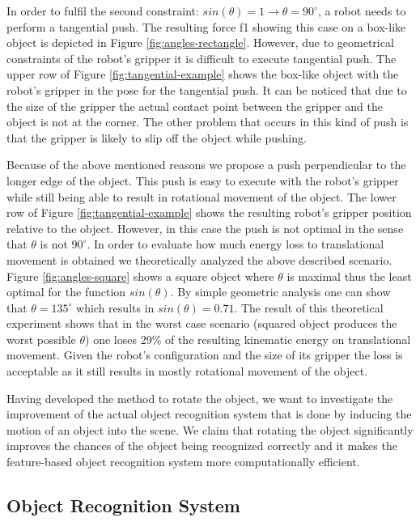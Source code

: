 In order to fulfil the second constraint: $sin(\theta) = 1 \to \theta = 90 ^\circ$, a robot needs to perform a tangential push. The resulting force f1 showing this case on a box-like object is depicted in Figure \ref{fig:angles-rectangle}. However, due to geometrical constraints of the robot's gripper it is difficult to execute tangential push. The upper row of Figure \ref{fig:tangential-example} shows the box-like object with the robot's gripper in the pose for the tangential push. It can be noticed that due to the size of the gripper the actual contact point between the gripper and the object is not at the corner. The other problem that occurs in this kind of push is that the gripper is likely to slip off the object while pushing.

Because of the above mentioned reasons we propose a push perpendicular to the longer edge of the object. This push is easy to execute with the robot's gripper while still being able to result in rotational movement of the object. The lower row of Figure \ref{fig:tangential-example} shows the resulting robot's gripper position relative to the object. However, in this case the push is not optimal in the sense that $\theta$ is not $90 ^\circ$. In order to evaluate how much energy loss to translational movement is obtained we theoretically analyzed the above described scenario. Figure \ref{fig:angles-square} shows a square object where $\theta$ is maximal thus the least optimal for the function $sin(\theta)$. By simple geometric analysis one can show that $\theta =135 ^\circ$ which results in $sin(\theta) = 0.71$. The result of this theoretical experiment shows that in the worst case scenario (squared object produces the worst possible $\theta$) one loses 29\% of the resulting kinematic energy on translational movement. Given the robot's configuration and the size of its gripper the loss is acceptable as it still results in mostly rotational movement of the object. 

Having developed the method to rotate the object, we want to investigate the improvement of the actual object recognition system that is done by inducing the motion of an object into the scene. We claim that rotating the object significantly improves the chances of the object being recognized correctly and it makes the feature-based object recognition system more computationally efficient.

\subsection{Object Recognition System}

